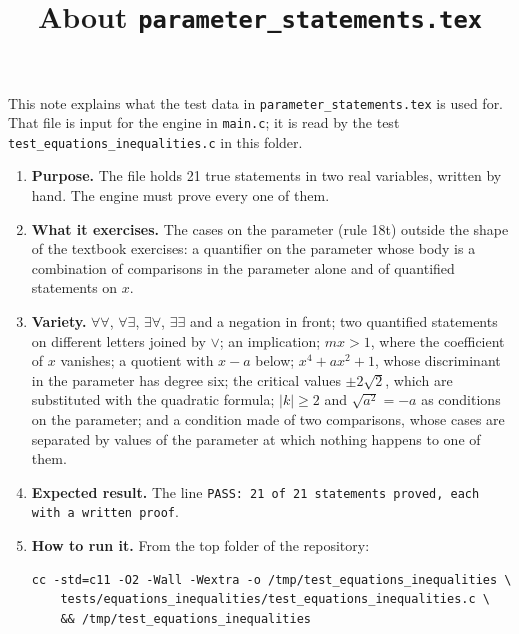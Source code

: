 \documentclass[11pt,a4paper]{article}
\title{About \texttt{parameter\_statements.tex}}
\author{}
\date{}
\begin{document}
\maketitle
This note explains what the test data in \texttt{parameter\_statements.tex} is used for. That file is input for the engine in \texttt{main.c}; it is read by the test \texttt{test\_equations\_inequalities.c} in this folder.

\begin{enumerate}
\item \textbf{Purpose.} The file holds 21 true statements in two real variables, written by hand. The engine must prove every one of them.

\item \textbf{What it exercises.} The cases on the parameter (rule 18t) outside the shape of the textbook exercises: a quantifier on the parameter whose body is a combination of comparisons in the parameter alone and of quantified statements on $x$.

\item \textbf{Variety.} $\forall\forall$, $\forall\exists$, $\exists\forall$, $\exists\exists$ and a negation in front; two quantified statements on different letters joined by $\lor$; an implication; $mx > 1$, where the coefficient of $x$ vanishes; a quotient with $x - a$ below; $x^{4} + ax^{2} + 1$, whose discriminant in the parameter has degree six; the critical values $\pm 2\sqrt{2}$, which are substituted with the quadratic formula; $\left|k\right| \ge 2$ and $\sqrt{a^{2}} = -a$ as conditions on the parameter; and a condition made of two comparisons, whose cases are separated by values of the parameter at which nothing happens to one of them.

\item \textbf{Expected result.} The line \texttt{PASS: 21 of 21 statements proved, each with a written proof}.

\item \textbf{How to run it.} From the top folder of the repository:
\begin{verbatim}
cc -std=c11 -O2 -Wall -Wextra -o /tmp/test_equations_inequalities \
    tests/equations_inequalities/test_equations_inequalities.c \
    && /tmp/test_equations_inequalities
\end{verbatim}
\end{enumerate}
\end{document}
